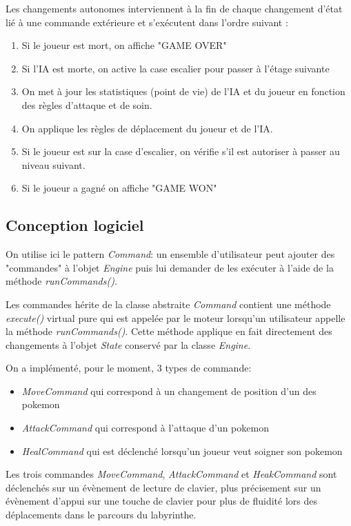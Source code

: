 \documentclass[a4paper,12pt]{article}
\begin{document}
    Les changements autonomes interviennent à la fin de chaque changement d'état lié à une commande extérieure et s'exécutent dans l'ordre suivant : 
    \begin{enumerate}
        \item Si le joueur est mort, on affiche "GAME OVER"
        \item Si l'IA est morte, on active la case escalier pour passer à l'étage suivante
        \item On met à jour les statistiques (point de vie) de l'IA et du joueur en fonction des règles d'attaque et de soin.
        \item On applique les règles de déplacement du joueur et de l'IA. 
        \item Si le joueur est sur la case d'escalier, on vérifie s'il est autoriser à passer au niveau suivant.
\item Si le joueur a gagné on affiche "GAME WON"
    \end{enumerate}
    
    
    
    
    


    \clearpage
    \subsection{Conception logiciel}
On utilise ici le pattern \emph{Command}: un ensemble d'utilisateur peut ajouter des "commandes" à l'objet \emph{Engine} puis lui demander de les exécuter à l'aide de la méthode \emph{runCommands()}.

Les commandes hérite de la classe abstraite \emph{Command} contient une méthode \emph{execute()} virtual pure qui est appelée par le moteur lorsqu'un utilisateur appelle la méthode \emph{runCommands()}. Cette méthode applique en fait directement des changements à l'objet \emph{State} conservé par la classe \emph{Engine}.

On a  implémenté, pour le moment, 3 types de commande:
\begin{itemize}
\item \emph{MoveCommand} qui correspond à un changement de position d'un des pokemon
\item \emph{AttackCommand} qui correspond à l'attaque d'un pokemon
\item \emph{HealCommand} qui est déclenché lorsqu'un joueur veut soigner son pokemon 
\end{itemize}

Les trois commandes \emph{MoveCommand}, \emph{AttackCommand} et \emph{HeakCommand} sont déclenchés sur un évènement de lecture de clavier, plus précisement sur un évènement d'appui sur une touche de clavier pour plus de fluidité lors des déplacements dans le parcours du labyrinthe.
\end{document}
